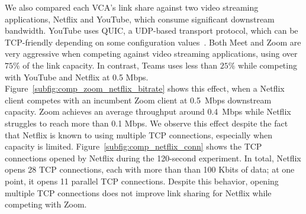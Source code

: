 We also compared each VCA's link share against two video streaming
applications, Netflix and YouTube,
which consume significant downstream bandwidth. 
YouTube uses QUIC, a UDP-based transport protocol,
which can be TCP-friendly depending on some configuration values~\cite{corbel2019assessing}. 
Both Meet and Zoom are
very aggressive when competing against video streaming applications, using
over $75\%$ of the link capacity. In contrast, Teams uses
less than $25\%$ while competing with YouTube and Netflix at 0.5 Mbps.  
Figure~\ref{subfig:comp_zoom_netflix_bitrate} shows this effect, when a
Netflix client competes with an incumbent Zoom client at 0.5~Mbps downstream
capacity. Zoom achieves an average throughput around 0.4~Mbps while
Netflix struggles to reach more than 0.1 Mbps. We observe this effect despite
the fact that Netflix is
known to using multiple TCP connections, especially when capacity is limited.
Figure~\ref{subfig:comp_netflix_conn} shows the TCP connections
opened by Netflix during the 120-second experiment. In total, Netflix opens 28
TCP connections, each with more than than 100 Kbits of data; at one point, it
opens 11 parallel TCP
connections. Despite this behavior, opening multiple TCP connections
does not improve link sharing for Netflix while competing with Zoom. 



